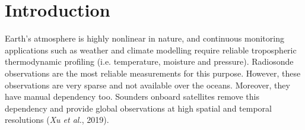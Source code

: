 \documentclass[a4paper,12pt,twoside]{article}
\begin{document}
\newpage
{}
\tableofcontents
\listoffigures

\newpage
\pagestyle{fancy}
\renewcommand{\sectionmark}[1]{\markright{\thesection\,\ #1}}
\renewcommand{\footrulewidth}{0.4pt}


\section{Introduction}
\noindent  Earth's atmosphere is highly nonlinear in nature, and continuous monitoring applications such as weather and climate modelling require reliable tropospheric thermodynamic profiling (i.e. temperature, moisture and pressure). Radiosonde observations are the most reliable measurements for this purpose. However, these observations are very sparse and not available over the oceans. Moreover, they have manual dependency too. Sounders onboard satellites remove this dependency and provide global observations at high spatial and temporal resolutions (\textit{Xu et al.}, 2019).\\ 
\end{document}
